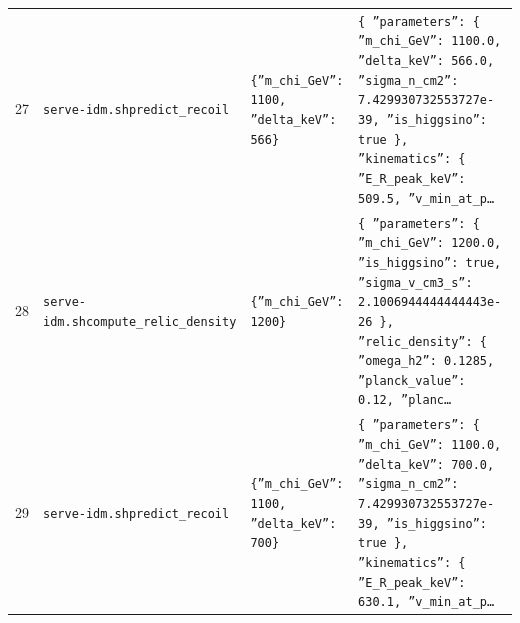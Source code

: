 \documentclass[11pt,a4paper]{article}
\begin{document}
\begin{longtable}{@{}p{}p{}p{}p{}@{}}
27 & \texttt{serve-idm.sh}\newline\texttt{predict\_\allowbreak{}recoil} & \texttt{\{''m\_\allowbreak{}chi\_\allowbreak{}GeV'':\allowbreak{} 1100,\allowbreak{} ''delta\_\allowbreak{}keV'':\allowbreak{} 566\}\allowbreak{}} & \texttt{\{   ''parameters'':\allowbreak{} \{     ''m\_\allowbreak{}chi\_\allowbreak{}GeV'':\allowbreak{} 1100.0,\allowbreak{}     ''delta\_\allowbreak{}keV'':\allowbreak{} 566.0,\allowbreak{}     ''sigma\_\allowbreak{}n\_\allowbreak{}cm2'':\allowbreak{} 7.429930732553727e-39,\allowbreak{}     ''is\_\allowbreak{}higgsino'':\allowbreak{} true   \}\allowbreak{},\allowbreak{}   ''kinematics'':\allowbreak{} \{     ''E\_\allowbreak{}R\_\allowbreak{}peak\_\allowbreak{}keV'':\allowbreak{} 509.5,\allowbreak{}     ''v\_\allowbreak{}min\_\allowbreak{}at\_\allowbreak{}p\ldots{}\allowbreak{}} \\
28 & \texttt{serve-idm.sh}\newline\texttt{compute\_\allowbreak{}relic\_\allowbreak{}density} & \texttt{\{''m\_\allowbreak{}chi\_\allowbreak{}GeV'':\allowbreak{} 1200\}\allowbreak{}} & \texttt{\{   ''parameters'':\allowbreak{} \{     ''m\_\allowbreak{}chi\_\allowbreak{}GeV'':\allowbreak{} 1200.0,\allowbreak{}     ''is\_\allowbreak{}higgsino'':\allowbreak{} true,\allowbreak{}     ''sigma\_\allowbreak{}v\_\allowbreak{}cm3\_\allowbreak{}s'':\allowbreak{} 2.1006944444444443e-26   \}\allowbreak{},\allowbreak{}   ''relic\_\allowbreak{}density'':\allowbreak{} \{     ''omega\_\allowbreak{}h2'':\allowbreak{} 0.1285,\allowbreak{}     ''planck\_\allowbreak{}value'':\allowbreak{} 0.12,\allowbreak{}     ''planc\ldots{}\allowbreak{}} \\
29 & \texttt{serve-idm.sh}\newline\texttt{predict\_\allowbreak{}recoil} & \texttt{\{''m\_\allowbreak{}chi\_\allowbreak{}GeV'':\allowbreak{} 1100,\allowbreak{} ''delta\_\allowbreak{}keV'':\allowbreak{} 700\}\allowbreak{}} & \texttt{\{   ''parameters'':\allowbreak{} \{     ''m\_\allowbreak{}chi\_\allowbreak{}GeV'':\allowbreak{} 1100.0,\allowbreak{}     ''delta\_\allowbreak{}keV'':\allowbreak{} 700.0,\allowbreak{}     ''sigma\_\allowbreak{}n\_\allowbreak{}cm2'':\allowbreak{} 7.429930732553727e-39,\allowbreak{}     ''is\_\allowbreak{}higgsino'':\allowbreak{} true   \}\allowbreak{},\allowbreak{}   ''kinematics'':\allowbreak{} \{     ''E\_\allowbreak{}R\_\allowbreak{}peak\_\allowbreak{}keV'':\allowbreak{} 630.1,\allowbreak{}     ''v\_\allowbreak{}min\_\allowbreak{}at\_\allowbreak{}p\ldots{}\allowbreak{}} \\

\end{longtable}
\end{document}
